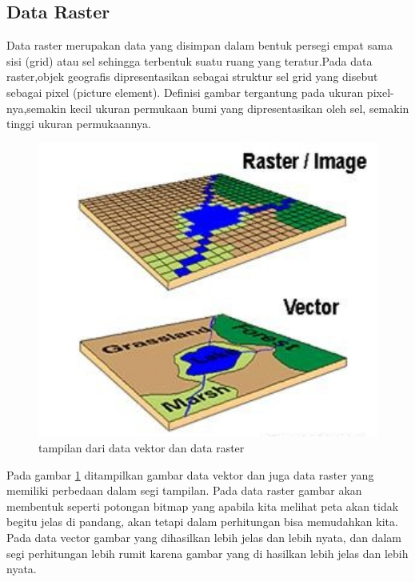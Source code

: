 \subsection{Data Raster}
Data raster merupakan data yang disimpan dalam bentuk persegi empat sama sisi (grid)
atau sel sehingga terbentuk suatu ruang yang teratur.Pada data raster,objek geografis dipresentasikan sebagai struktur sel grid yang disebut sebagai pixel (picture element). Definisi gambar tergantung pada ukuran pixel-nya,semakin kecil ukuran permukaan bumi yang dipresentasikan oleh sel, semakin tinggi ukuran permukaannya.
\begin{figure}[ht]
\centerline{\includegraphics[width=1\textwidth] {figures/vektor01.jpg}}
\caption{tampilan dari data vektor dan data raster}
\label{vektor01}
\end{figure}
Pada gambar \ref{vektor01} ditampilkan gambar data vektor dan juga data raster yang memiliki perbedaan dalam segi tampilan. Pada data raster gambar akan membentuk seperti potongan bitmap yang apabila kita melihat peta akan tidak begitu jelas di pandang, akan tetapi dalam perhitungan bisa memudahkan kita. Pada data vector gambar yang dihasilkan lebih jelas dan lebih nyata, dan dalam segi perhitungan lebih rumit karena gambar yang di hasilkan lebih jelas dan lebih nyata.

